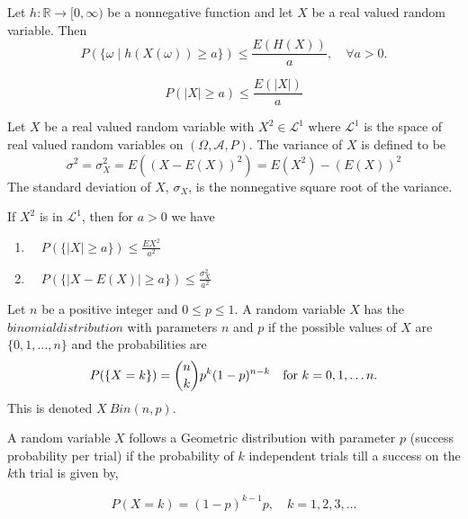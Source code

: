 \documentclass[../main.tex]{subfiles}
\begin{document}
\begin{theorem}
Let $h: \mathbb{R} \to [0,\infty)$ be a nonnegative function and let $X$ be a real valued random variable. Then 
\[
P(\{\omega \mid h(X(\omega)) \geq a\}) \leq \frac{E(H(X))}{a}, \quad \forall a > 0.
\]
\end{theorem}



\begin{corollary} \label{Markovs Inequality}
\[
P({|X| \geq a}) \leq \frac{E(|X|)}{a}
\]

\end{corollary}



\begin{definition}\label{def: Variance and Standard Deviation}
Let $X$ be a real valued random variable with $X^2 \in \mathcal{L}^1$ where $\mathcal{L}^1$ is the space of real valued random variables on $(\Omega, \mathcal{A}, P)$. The variance of $X$ is defined to be
\[
\sigma^2 = \sigma^2_X = E((X - E(X))^2) = E(X^2) - (E(X))^2
\]
The standard deviation of $X$, $\sigma_X$, is the nonnegative square root of the variance. 

\end{definition}






\begin{corollary}
If $X^2$ is in $\mathcal{L}^1$, then for $a>0$ we have
\begin{enumerate}
    \item $ \quad P(\{|X| \geq a\}) \leq \frac{E{X^2}}{a^2}$
    \item $ \quad P(\{|X - E(X)| \geq a\}) \leq \frac{\sigma^2_X}{a^2}$
\end{enumerate}

\end{corollary}


\begin{definition}
Let $n$ be a positive integer and $ 0 \leq p \leq 1$. A random variable $X$ has the $binomial distribution$ with parameters
$n$ and $p$ if the possible values of $X$ are $\{0,1,\dots,n\}$ and the probabilities are 
\[
P(\{X=k\}) = \binom{n}{k}p^k(1-p)^{n-k} \quad \textnormal{for } k = 0,1,\dots n.
\]
This is denoted $X ~ Bin(n,p)$.
    
\end{definition}


\begin{definition}
A random variable \( X \) follows a Geometric distribution with parameter \( p \) (success probability per trial) if the probability of $k$ independent trials till a success on the $k$th trial is given by,

\[
P(X = k) = (1 - p)^{k-1} p, \quad k = 1, 2, 3, \dots
\]
\end{definition}
\end{document}
